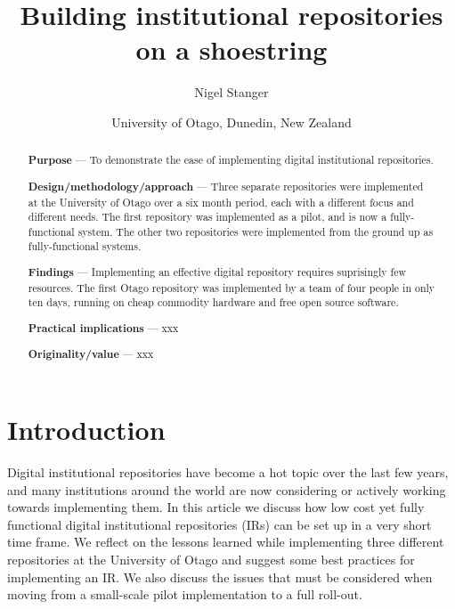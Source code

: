 \documentclass[12pt,pdftex,a4paper,titlepage]{article}
\title{Building institutional repositories on a shoestring}
\author{Nigel Stanger}
\date{University of Otago, Dunedin, New Zealand}
\begin{document}
\maketitle




\begin{abstract}
\textbf{Purpose} --- To demonstrate the ease of implementing digital institutional repositories.

\noindent\textbf{Design/methodology/approach} --- Three separate repositories were implemented at the University of Otago over a six month period, each with a different focus and different needs. The first repository was implemented as a pilot, and is now a fully-functional system. The other two repositories were implemented from the ground up as fully-functional systems.

\noindent\textbf{Findings} --- Implementing an effective digital repository requires suprisingly few resources. The first Otago repository was implemented by a team of four people in only ten days, running on cheap commodity hardware and free open source software.

\noindent\textbf{Practical implications} --- xxx

\noindent\textbf{Originality/value} --- xxx
\end{abstract}


\section{Introduction}

Digital institutional repositories have become a hot topic over the last few years, and many institutions around the world are now considering or actively working towards implementing them. In this article we discuss how low cost yet fully functional digital institutional repositories (IRs) can be set up in a very short time frame. We reflect on the lessons learned while implementing three different repositories at the University of Otago and suggest some best practices for implementing an IR. We also discuss the issues that must be considered when moving from a small-scale pilot implementation to a full roll-out.


\end{document}
